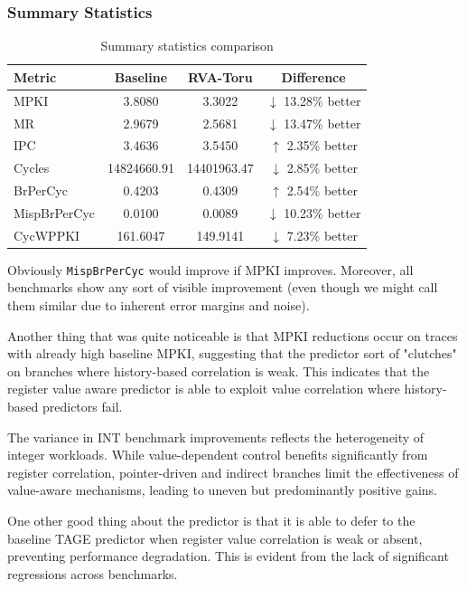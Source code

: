 \documentclass[11pt,a4paper]{article}
\begin{document}
\subsubsection{Summary Statistics}

\begin{table}[h]
\centering
\begin{tabular}{lccc}
\toprule
\textbf{Metric} & \textbf{Baseline} & \textbf{RVA-Toru} & \textbf{Difference} \\
\midrule
MPKI           & 3.8080      & 3.3022      & $\downarrow$ 13.28\% better \\
MR             & 2.9679      & 2.5681      & $\downarrow$ 13.47\% better \\
IPC            & 3.4636      & 3.5450      & $\uparrow$ 2.35\% better \\
Cycles         & 14824660.91 & 14401963.47 & $\downarrow$ 2.85\% better \\
BrPerCyc       & 0.4203      & 0.4309      & $\uparrow$ 2.54\% better \\
MispBrPerCyc   & 0.0100      & 0.0089      & $\downarrow$ 10.23\% better \\
CycWPPKI       & 161.6047    & 149.9141    & $\downarrow$ 7.23\% better \\
\bottomrule
\end{tabular}
\caption{Summary statistics comparison}
\end{table}


Obviously \texttt{MispBrPerCyc} would improve if MPKI improves. Moreover, all benchmarks show any sort of visible improvement (even though we might call them similar due to inherent error margins and noise).

Another thing that was quite noticeable is that MPKI reductions occur on traces with already high baseline MPKI, suggesting that the predictor sort of "clutches" on branches where history-based correlation is weak. This indicates that the register value aware predictor is able to exploit value correlation where history-based predictors fail.

The variance in INT benchmark improvements reflects the heterogeneity of integer workloads. While value-dependent control benefits significantly from register correlation, pointer-driven and indirect branches limit the effectiveness of value-aware mechanisms, leading to uneven but predominantly positive gains.

One other good thing about the predictor is that it is able to defer to the baseline TAGE predictor when register value correlation is weak or absent, preventing performance degradation. This is evident from the lack of significant regressions across benchmarks.
\end{document}
